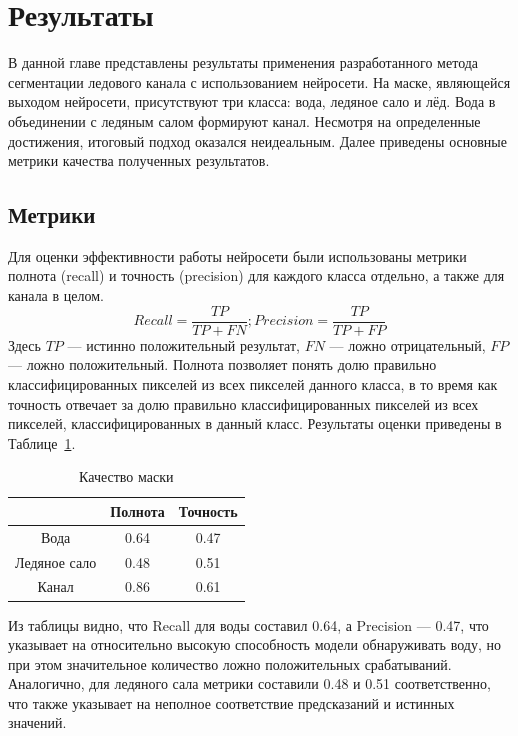 \section{Результаты}
В данной главе представлены результаты применения разработанного метода сегментации ледового канала с использованием нейросети. 
На маске, являющейся выходом нейросети, присутствуют три класса: вода, ледяное сало и лёд. Вода в объединении с ледяным салом 
формируют канал. Несмотря на определенные достижения, итоговый подход оказался неидеальным. Далее приведены основные метрики качества полученных результатов.

\subsection{Метрики}

Для оценки эффективности работы нейросети были использованы метрики полнота (recall) и точность (precision) для каждого класса отдельно, а также для канала в целом. 
\[Recall = \frac{TP}{TP + FN}; Precision = \frac{TP}{TP + FP}\]
Здесь $TP$ --- истинно положительный результат, $FN$ --- ложно отрицательный, $FP$ --- ложно положительный. Полнота позволяет понять долю правильно классифицированных 
пикселей из всех пикселей данного класса, в то время как точность отвечает за долю правильно классифицированных пикселей из всех пикселей, 
классифицированных в данный класс.
Результаты оценки приведены в Таблице~\ref{tab:nn_results}.
\begin{table}[h]
    \centering 
        \begin{tabular}{|c|c|c|} 
            \hline
            & Полнота & Точность \\
            \hline
            Вода & 0.64 & 0.47 \\ \hline
            Ледяное сало & 0.48 & 0.51 \\ \hline
            Канал & 0.86 & 0.61 \\ \hline
        \end{tabular}
    \caption{Качество маски}\label{tab:nn_results}
\end{table}

Из таблицы видно, что Recall для воды составил 0.64, а Precision — 0.47, что указывает на относительно высокую способность модели обнаруживать воду, 
но при этом значительное количество ложно положительных срабатываний. Аналогично, для ледяного сала метрики составили 0.48 и 0.51 соответственно, что также 
указывает на неполное соответствие предсказаний и истинных значений.

